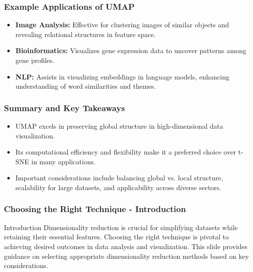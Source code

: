 \documentclass[aspectratio=169]{beamer}
\begin{document}
\begin{frame}[fragile]
    \frametitle{Example Applications of UMAP}
    \begin{itemize}
        \item \textbf{Image Analysis:} Effective for clustering images of similar objects and revealing relational structures in feature space.
        \item \textbf{Bioinformatics:} Visualizes gene expression data to uncover patterns among gene profiles.
        \item \textbf{NLP:} Assists in visualizing embeddings in language models, enhancing understanding of word similarities and themes.
    \end{itemize}
\end{frame}

\begin{frame}[fragile]
    \frametitle{Summary and Key Takeaways}
    \begin{itemize}
        \item UMAP excels in preserving global structure in high-dimensional data visualization.
        \item Its computational efficiency and flexibility make it a preferred choice over t-SNE in many applications.
        \item Important considerations include balancing global vs. local structure, scalability for large datasets, and applicability across diverse sectors.
    \end{itemize}
\end{frame}

\begin{frame}[fragile]
    \frametitle{Choosing the Right Technique - Introduction}
    \begin{block}{Introduction}
        Dimensionality reduction is crucial for simplifying datasets while retaining their essential features. 
        Choosing the right technique is pivotal to achieving desired outcomes in data analysis and visualization. 
        This slide provides guidance on selecting appropriate dimensionality reduction methods based on key considerations.
    \end{block}
\end{frame}
\end{document}
